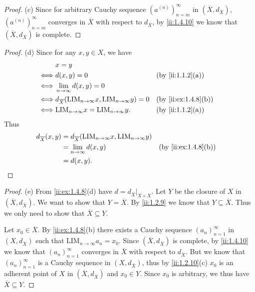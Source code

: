 \begin{proof}{(c)}
  Since for arbitrary Cauchy sequence \((a^{(n)})_{n = m}^\infty\) in \((\overline{X}, d_{\overline{X}})\), \((a^{(n)})_{n = m}^\infty\) converges in \(\overline{X}\) with respect to \(d_{\overline{X}}\), by \cref{ii:1.4.10} we know that \((\overline{X}, d_{\overline{X}})\) is complete.
\end{proof}

\begin{proof}{(d)}
  Since for any \(x, y \in X\), we have
  \begin{align*}
         & x = y                                                                                                \\
    \iff & d(x, y) = 0                                                                    &  & \by{ii:1.1.2}[a]    \\
    \iff & \lim_{n \to \infty} d(x, y) = 0                                                                      \\
    \iff & d_{\overline{X}}(\text{LIM}_{n \to \infty} x, \text{LIM}_{n \to \infty} y) = 0 &  & \by{ii:ex:1.4.8}[b] \\
    \iff & \text{LIM}_{n \to \infty} x = \text{LIM}_{n \to \infty} y.                     &  & \by{ii:1.1.2}[a]
  \end{align*}
  Thus
  \begin{align*}
    d_{\overline{X}}(x, y) & = d_{\overline{X}}(\text{LIM}_{n \to \infty} x, \text{LIM}_{n \to \infty} y)                       \\
                           & = \lim_{n \to \infty} d(x, y)                                                &  & \by{ii:ex:1.4.8}[b] \\
                           & = d(x, y).
  \end{align*}
\end{proof}

\begin{proof}{(e)}
  From \cref{ii:ex:1.4.8}(d) have \(d = d_{\overline{X}}|_{X \times X}\).
  Let \(Y\) be the closure of \(X\) in \((\overline{X}, d_{\overline{X}})\).
  We want to show that \(Y = \overline{X}\).
  By \cref{ii:1.2.9} we know that \(Y \subseteq \overline{X}\).
  Thus we only need to show that \(\overline{X} \subseteq Y\).

  Let \(x_0 \in \overline{X}\).
  By \cref{ii:ex:1.4.8}(b) there exists a Cauchy sequence \((a_n)_{n = 1}^\infty\) in \((X, d_{\overline{X}})\) such that \(\text{LIM}_{n \to \infty} a_n = x_0\).
  Since \((\overline{X}, d_{\overline{X}})\) is complete, by \cref{ii:1.4.10} we know that \((a_n)_{n = 1}^\infty\) converges in \(\overline{X}\) with respect to \(d_{\overline{X}}\).
  But we know that \((a_n)_{n = 1}^\infty\) is a Cauchy sequence in \((X, d_{\overline{X}})\), thus by \cref{ii:1.2.10}(c) \(x_0\) is an adherent point of \(X\) in \((\overline{X}, d_{\overline{X}})\) and \(x_0 \in Y\).
  Since \(x_0\) is arbitrary, we thus have \(\overline{X} \subseteq Y\).
\end{proof}

